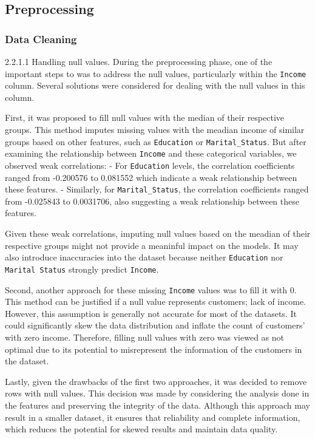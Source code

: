 \subsection{Preprocessing}

\subsubsection{Data Cleaning} 

    2.2.1.1 Handling null values. During the preprocessing phase, one of the important steps to was to address the null values, particularly within the \texttt{Income} column. Several solutions were considered for dealing with the null values in this column. 

    First, it was proposed to fill null values with the median of their respective groups. This method imputes missing values with the meadian income of similar groups based on other features, such as \texttt{Education} or \texttt{Marital\_Status}. But after examining the relationship between \texttt{Income} and these categorical variables, we observed weak correlations:
        - For \texttt{Education} levels, the correlation coefficients ranged from -0.200576 to 0.081552 which indicate a weak relationship between these features.
        - Similarly, for \texttt{Marital\_Status}, the correlation coefficients ranged from -0.025843 to 0.0031706, also suggesting a weak relationship between these features.

    Given these weak correlations, imputing null values based on the meadian of their respective groups might not provide a meaninful impact on the models. It may also introduce inaccuracies into the dataset because neither \texttt{Education} nor \texttt{Marital Status} strongly predict \texttt{Income}.

    Second, another approach for these missing \texttt{Income} values was to fill it with 0. This method can be justified if a null value represents customers; lack of income. However, this assumption is generally not accurate for most of the datasets. It could significantly skew the data distribution and inflate the count of customers' with zero income. Therefore, filling null values with zero was viewed as not optimal due to its potential to misrepresent the information of the customers in the dataset.

    Lastly, given the drawbacks of the first two approaches, it was decided to remove rows with null values. This decision was made by considering the analysis done in the features and preserving the integrity of the data. Although this approach may result in a smaller dataset, it ensures that reliability and complete information, which reduces the potential for skewed results and maintain data quality.

